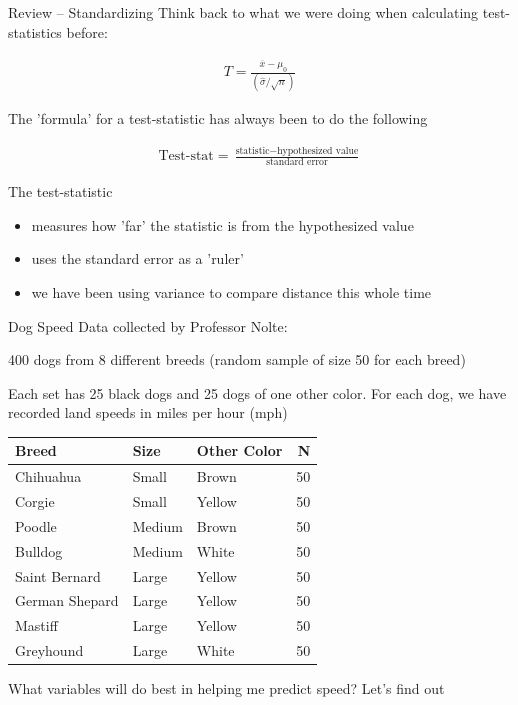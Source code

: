 \documentclass{beamer}
\begin{document}
\begin{frame}{Review -- Standardizing}
Think back to what we were doing when calculating test-statistics before:

\begin{align*}
T = \frac{\overline{x} - \mu_0}{(\hat{\sigma}/\sqrt{n})}
\end{align*} \vspace{4mm}

The 'formula' for a test-statistic has always been to do the following

\begin{align*}
\text{Test-stat} = \frac{\text{statistic} - \text{hypothesized value}}{\text{standard error}}
\end{align*} \vspace{2mm}

The test-statistic
\begin{itemize}
    \item measures how 'far' the statistic is from the hypothesized value
    \item uses the standard error as a 'ruler'
    \item we have been using variance to compare distance this whole time
\end{itemize}


\end{frame}


\begin{frame}{Dog Speed}
\small
Data collected by Professor Nolte: 

400 dogs from 8 different breeds (random sample of size 50 for each breed) \vspace{2mm} 

Each set has 25 black dogs and 25 dogs of one other color. For each dog, we have recorded land speeds in miles per hour (mph) \vspace{2mm}

\begin{table}[ht]
\centering
\begin{tabular}{lllr}
  \hline
Breed & Size & Other Color & N \\ 
  \hline
Chihuahua & Small & Brown & 50 \\ 
  Corgie & Small & Yellow & 50 \\ 
  Poodle & Medium & Brown & 50 \\ 
  Bulldog & Medium & White & 50 \\ 
  Saint Bernard & Large & Yellow & 50 \\ 
  German Shepard & Large & Yellow & 50 \\ 
  Mastiff & Large & Yellow & 50 \\ 
  Greyhound & Large & White & 50 \\ 
   \hline
\end{tabular}
\end{table} \vspace{2mm}

What variables will do best in helping me predict speed? Let's find out

\end{frame}
\end{document}
